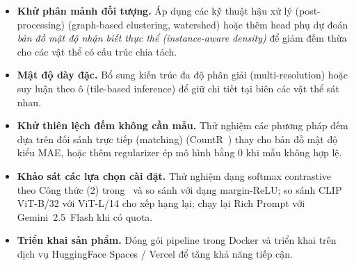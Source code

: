 \documentclass[a4paper,12pt]{report}
\numberwithin{figure}{chapter}
\numberwithin{table}{chapter}
\begin{document}
\begin{itemize}
    \item \textbf{Khử phân mảnh đối tượng.} Áp dụng các kỹ thuật hậu xử lý (post-processing) (graph-based clustering, watershed) hoặc thêm head phụ dự đoán \textit{bản đồ mật độ nhận biết thực thể (instance-aware density)} để giảm đếm thừa cho các vật thể có cấu trúc chia tách.
    \item \textbf{Mật độ dày đặc.} Bổ sung kiến trúc đa độ phân giải (multi-resolution) hoặc suy luận theo ô (tile-based inference) để giữ chi tiết tại biên các vật thể sát nhau.
    \item \textbf{Khử thiên lệch đếm không cần mẫu.} Thử nghiệm các phương pháp đếm dựa trên đối sánh trực tiếp (matching) (CountR~\cite{countr}) thay cho bản đồ mật độ kiểu MAE, hoặc thêm regularizer ép mô hình bằng 0 khi mẫu không hợp lệ.
    \item \textbf{Khảo sát các lựa chọn cài đặt.} Thử nghiệm dạng softmax contrastive theo Công thức (2) trong~\cite{vacount} và so sánh với dạng margin-ReLU; so sánh CLIP ViT-B/32 với ViT-L/14 cho xếp hạng lại; chạy lại Rich Prompt với Gemini~2.5~Flash khi có quota.
    \item \textbf{Triển khai sản phẩm.} Đóng gói pipeline trong Docker và triển khai trên dịch vụ HuggingFace Spaces / Vercel để tăng khả năng tiếp cận.
\end{itemize}


\end{document}
